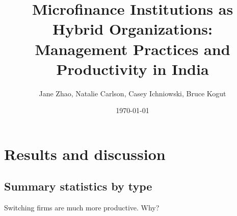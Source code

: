 \documentclass[11pt]{article}
\begin{document}
\title{Microfinance Institutions as Hybrid Organizations: Management Practices and Productivity in India}

\author{Jane Zhao, Natalie Carlson, Casey Ichniowski, Bruce Kogut}
\date{\today}

\maketitle


\section{Results and discussion}

\subsection{Summary statistics by type}

Switching firms are much more productive. Why?
\end{document}
